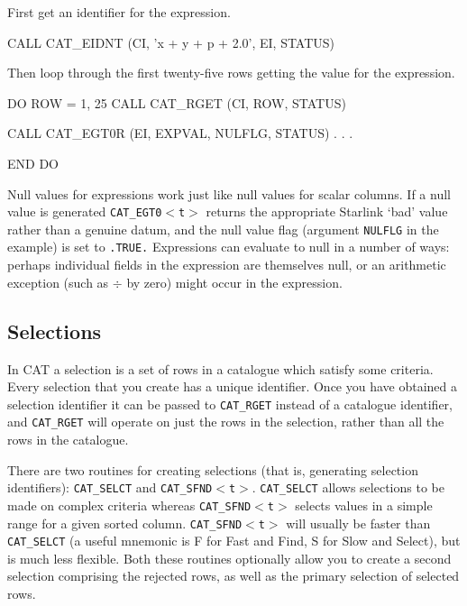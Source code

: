 \documentclass[11pt,twoside]{starlink}
\begin{document}
First get an identifier for the expression.

\begin{terminalv}
      CALL CAT_EIDNT (CI, 'x + y + p + 2.0', EI, STATUS)
\end{terminalv}

Then loop through the first twenty-five rows getting the value for the
expression.

\begin{terminalv}
      DO ROW = 1, 25
         CALL CAT_RGET (CI, ROW, STATUS)

         CALL CAT_EGT0R (EI, EXPVAL, NULFLG, STATUS)
           .
           .
           .

      END DO
\end{terminalv}

Null values for expressions work just like null values for scalar
columns. If a null value is generated \texttt{CAT\_EGT0$<$t$>$} returns
the appropriate Starlink `bad' value rather than a genuine datum, and
the null value flag (argument \texttt{NULFLG} in the example) is set to
\texttt{.TRUE.} Expressions can evaluate to null in a number of ways:
perhaps individual fields in the expression are themselves null, or
an arithmetic exception (such as $\div$ by zero) might occur in the
expression.


\subsection{Selections}

In CAT a selection is a set of rows in a catalogue which satisfy some
criteria. Every selection that you create has a unique identifier.
Once you have obtained a selection identifier it can be passed to
\texttt{CAT\_RGET} instead of a catalogue identifier, and \texttt{CAT\_RGET} will operate on just the rows in the selection, rather than
all the rows in the catalogue.

There are two routines for creating selections (that is, generating
selection identifiers): \texttt{CAT\_SELCT} and \texttt{CAT\_SFND$<$t$>$}.
\texttt{CAT\_SELCT} allows selections to be made on complex criteria
whereas \texttt{CAT\_SFND$<$t$>$} selects values in a simple range for a
given sorted column. \texttt{CAT\_SFND$<$t$>$} will usually be faster than
\texttt{CAT\_SELCT} (a useful mnemonic is F for Fast and Find, S for Slow
and Select), but is much less flexible. Both these routines optionally
allow you to create a second selection comprising the rejected rows,
as well as the primary selection of selected rows.
\end{document}
